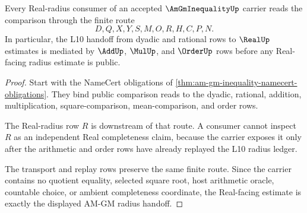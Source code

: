 \begin{theorem}
\label{thm:am-gm-inequality-l10-radius-handoff}
Every Real-radius consumer of an accepted $\AmGmInequalityUp$ carrier reads the comparison through the finite route
$$
D,Q,X,Y,S,M,O,R,H,C,P,N .
$$
In particular, the L10 handoff from dyadic and rational rows to $\RealUp$ estimates is mediated by $\AddUp$, $\MulUp$, and $\OrderUp$ rows before any Real-facing radius estimate is public.
\end{theorem}
\begin{proof}
Start with the NameCert obligations of \autoref{thm:am-gm-inequality-namecert-obligations}. They bind public comparison reads to the dyadic, rational, addition, multiplication, square-comparison, mean-comparison, and order rows.

The Real-radius row $R$ is downstream of that route. A consumer cannot inspect $R$ as an independent Real completeness claim, because the carrier exposes it only after the arithmetic and order rows have already replayed the L10 radius ledger.

The transport and replay rows preserve the same finite route. Since the carrier contains no quotient equality, selected square root, host arithmetic oracle, countable choice, or ambient completeness coordinate, the Real-facing estimate is exactly the displayed AM-GM radius handoff.
\end{proof}


\begin{closurestatus}{\AmGmInequalityUp}
  \theoryclosure{\seedClosure}
  \formalstatus{\unformalizedV}
\end{closurestatus}
